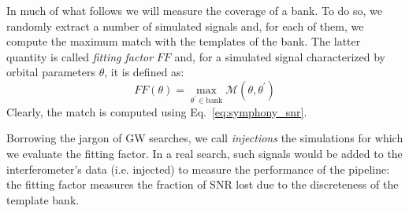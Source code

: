 \documentclass[twocolumn,showpacs,preprintnumbers,nofootinbib,prd,
superscriptaddress,10pt]{revtex4-2}
\begin{document}
In much of what follows we will measure the coverage of a bank. To do so, we randomly extract a number of simulated signals and, for each of them, we compute the maximum match with the templates of the bank. The latter quantity is called {\it fitting factor} $FF$ and, for a simulated signal characterized by orbital parameters $\theta$, it is defined as:
%
\begin{equation}\label{eq:FF}
	FF(\theta) = \max_{\theta^\prime \in \text{bank}} \mathcal{M}(\theta, \theta^\prime)
\end{equation}
%
Clearly, the match is computed using Eq.~\eqref{eq:symphony_snr}.

Borrowing the jargon of GW searches, we call {\it injections} the simulations for which we evaluate the fitting factor. In a real search, such signals would be added to the interferometer's data (i.e. injected) to measure the performance of the pipeline: the fitting factor measures the fraction of SNR lost due to the discreteness of the template bank.

\end{document}
